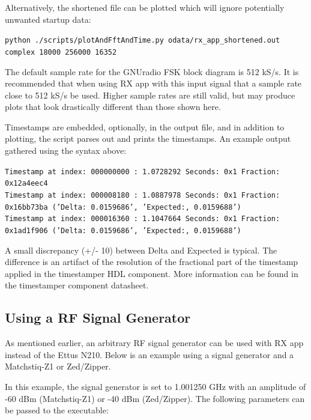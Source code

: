 \documentclass{article}
\begin{document}
\noindent Alternatively, the shortened file can be plotted which will ignore potentially unwanted startup data:\par\medskip
\noindent\texttt{python ./scripts/plotAndFftAndTime.py odata/rx\_app\_shortened.out complex 18000 256000 16352}\par\medskip
\noindent The default sample rate for the GNUradio FSK block diagram is 512 kS/s. It is recommended that when using RX app with this input signal that a sample rate close to 512 kS/s be used. Higher sample rates are still valid, but may produce plots that look drastically different than those shown here.\par\medskip
\newpage
\noindent Timestamps are embedded, optionally, in the output file, and in addition to plotting, the script parses out and prints the timestamps. An example output gathered using the syntax above:\par\medskip
\scriptsize\noindent\texttt{Timestamp at index: 000000000 :  1.0728292 Seconds: 0x1 Fraction: 0x12a4eec4  \\
Timestamp at index: 000008180 :  1.0887978 Seconds: 0x1 Fraction: 0x16bb73ba ('Delta: 0.0159686', 'Expected:, 0.0159688')\\
Timestamp at index: 000016360 :  1.1047664 Seconds: 0x1 Fraction: 0x1ad1f906 ('Delta: 0.0159686', 'Expected:, 0.0159688')}\par\medskip
\noindent\small A small discrepancy (+/- 10) between Delta and Expected is typical. The difference is an artifact of the resolution of the fractional part of the timestamp applied in the timestamper HDL component. More information can be found in the timestamper component datasheet.\par\medskip
\par\medskip

\subsection{Using a RF Signal Generator}
\noindent As mentioned earlier, an arbitrary RF signal generator can be used with RX app instead of the Ettus N210. Below is an example using a signal generator and a Matchstiq-Z1 or Zed/Zipper.\par\medskip
\noindent In this example, the signal generator is set to 1.001250 GHz with an amplitude of -60 dBm (Matchstiq-Z1) or -40 dBm (Zed/Zipper). The following parameters can be passed to the executable:\par\medskip
\end{document}
